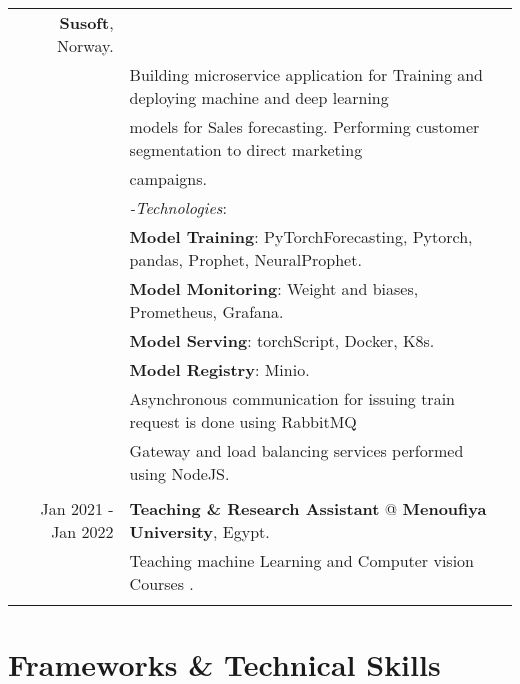 \documentclass[a4paper,10pt]{article}
\begin{document}
\begin{longtable}{r|l}
    \textbf{Susoft}, Norway. \\& 
    Building microservice application for Training and deploying machine and deep learning \\& models for Sales forecasting. 
    Performing customer segmentation to direct marketing \\& campaigns. \\&
    \textit{-Technologies}:\\&
     \textbf{Model Training}: PyTorchForecasting, Pytorch, pandas, Prophet, NeuralProphet. \\&
     \textbf{Model Monitoring}: Weight and biases, Prometheus, Grafana.\\&
     \textbf{Model Serving}: torchScript, Docker, K8s. \\&
     \textbf{Model Registry}: Minio. \\&
    Asynchronous communication for issuing train request is done using RabbitMQ \\&
    Gateway and load balancing services performed using NodeJS. \\&
    \\
    Jan 2021 - Jan 2022 & \textbf{Teaching \& Research Assistant} @ 
    \textbf{Menoufiya University}, Egypt. \\&
    Teaching machine Learning and Computer vision Courses . \\&
    
\end{longtable}

\section{\textbf{Frameworks \& Technical Skills}}
\end{document}
